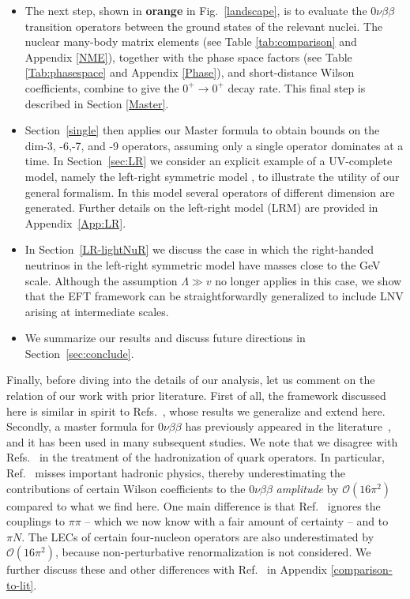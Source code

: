 \documentclass[letterpaper,11pt]{article}
\newcommand{\Or}{\mathcal O}
\newcommand{\sq}{^{2}}
\begin{document}
\begin{itemize}
\item The next step,  shown in {\color{burntorange} \textbf{orange}} in  Fig.~\ref{landscape},  
is to evaluate the $0 \nu \beta \beta$ transition operators between the ground states of the relevant nuclei. 
The nuclear many-body matrix elements (see Table \ref{tab:comparison} and Appendix \ref{NME}), together with the phase space factors (see Table \ref{Tab:phasespace} and 
Appendix \ref{Phase}), and short-distance Wilson coefficients, combine to give the $0^+ \rightarrow 0^+$ decay rate. This final step is described in Section \ref{Master}.


\item Section~\ref{single} then applies our Master formula to obtain bounds on the {dim-3}, {-6},{-7}, and {-9} operators,   
assuming only a single operator dominates at a time. In Section~\ref{sec:LR} we consider an explicit example of a UV-complete model, namely the left-right symmetric model \cite{Pati:1974yy, Mohapatra:1974hk, Senjanovic:1975rk}, to illustrate the utility of our general formalism. In this model several operators of different dimension are generated. Further details on the left-right model (LRM) are provided in Appendix~\ref{App:LR}. 

\item 
In Section~\ref{LR-lightNuR} we 
discuss the case in which the right-handed neutrinos in the left-right symmetric model have masses close to the GeV scale. 
 Although the assumption $\Lambda\gg v$ no longer applies in this case, we show that the EFT framework can be straightforwardly  generalized to include LNV arising at intermediate scales.

\item We summarize our results and discuss future directions in Section~\ref{sec:conclude}. 

\end{itemize} 


Finally, before diving into the details of our analysis, let us  comment on the relation of our work with prior literature.   First of all, the framework discussed here is similar in spirit to Refs.\ \cite{Prezeau:2003xn,Graesser:2016bpz}, whose results we generalize and extend here.
Secondly, a master formula for $0 \nu \beta \beta$ has previously appeared in the literature~\cite{Pas:2000vn,Pas:1999fc}, 
and it has been used in many subsequent studies. 
We note that we disagree with Refs.~\cite{Pas:2000vn,Pas:1999fc} in the treatment of the hadronization of quark operators. In particular, 
Ref.~\cite{Pas:2000vn} misses important hadronic physics, thereby underestimating the contributions of certain Wilson coefficients to the $0 \nu  \beta \beta$ {\em amplitude} by $\Or(16\pi\sq)$ compared to what we find here. One main difference is that Ref.\ \cite{Pas:2000vn} ignores the couplings to $\pi \pi$ -- which we now know with a fair amount of certainty \cite{Savage:1998yh,Nicholson:2016byl, Cirigliano:2017ymo,Nicholson:2018mwc} -- and to $\pi N$. The LECs of certain four-nucleon operators are also underestimated by $\Or(16\pi\sq)$, because non-perturbative renormalization is not considered. We further discuss these and other differences with Ref.\ \cite{Pas:2000vn} in Appendix \ref{comparison-to-lit}.
\end{document}
